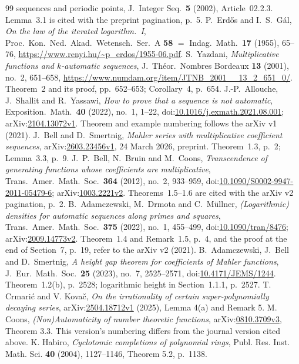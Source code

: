 \documentclass[11pt]{article}
\theoremstyle{plain}
\theoremstyle{definition}
\theoremstyle{remark}
\begin{document}
\begin{thebibliography}{99}
{sequences and periodic points}, J.\ Integer Seq.\ \textbf{5} (2002),
Article~02.2.3. Lemma~3.1 is cited with the preprint pagination, p.~5.
P.~Erd\H{o}s and I.~S.~G\'al, \emph{On the law of the iterated logarithm.~I},
Proc.\ Kon.\ Ned.\ Akad.\ Wetensch.\ Ser.~A \textbf{58} $=$ Indag.\ Math.\
\textbf{17} (1955), 65--76, \url{https://www.renyi.hu/~p_erdos/1955-06.pdf}.
\bibitem{yazdani2001} S.~Yazdani,
\emph{Multiplicative functions and $k$-automatic sequences},
J.\ Th\'eor.\ Nombres Bordeaux \textbf{13} (2001), no.~2, 651--658,
\url{https://www.numdam.org/item/JTNB_2001__13_2_651_0/}.
Theorem~2 and its proof, pp.~652--653; Corollary~4, p.~654.
 J.-P.~Allouche, J.~Shallit and R.~Yassawi,
\emph{How to prove that a sequence is not automatic},
Exposition.\ Math.\ \textbf{40} (2022), no.~1, 1--22,
doi:\href{https://doi.org/10.1016/j.exmath.2021.08.001}{10.1016/j.exmath.2021.08.001};
arXiv:\href{https://arxiv.org/abs/2104.13072v1}{2104.13072v1}.
Theorem and example numbering follows the arXiv v1 (2021).
 J.~Bell and D.~Smertnig,
\emph{Mahler series with multiplicative coefficient sequences},
arXiv:\href{https://arxiv.org/abs/2603.23456v1}{2603.23456v1},
24 March 2026, preprint. Theorem~1.3, p.~2; Lemma~3.3, p.~9.
 J.~P.~Bell, N.~Bruin and M.~Coons,
\emph{Transcendence of generating functions whose coefficients are multiplicative},
Trans.\ Amer.\ Math.\ Soc.\ \textbf{364} (2012), no.~2, 933--959,
doi:\href{https://doi.org/10.1090/S0002-9947-2011-05479-6}{10.1090/S0002-9947-2011-05479-6};
arXiv:\href{https://arxiv.org/abs/1003.2221v2}{1003.2221v2}.
Theorems~1.5--1.6 are cited with the arXiv v2 pagination, p.~2.
 B.~Adamczewski, M.~Drmota and C.~M\"ullner,
\emph{(Logarithmic) densities for automatic sequences along primes and squares},
Trans.\ Amer.\ Math.\ Soc.\ \textbf{375} (2022), no.~1, 455--499,
doi:\href{https://doi.org/10.1090/tran/8476}{10.1090/tran/8476};
arXiv:\href{https://arxiv.org/abs/2009.14773v2}{2009.14773v2}.
Theorem~1.4 and Remark~1.5, p.~4, and the proof at the end of Section~7,
p.~19, refer to the arXiv v2 (2021).
B.~Adamczewski, J.~Bell and D.~Smertnig,
\emph{A height gap theorem for coefficients of Mahler functions},
J.~Eur.~Math.~Soc.\ \textbf{25} (2023), no.~7, 2525--2571,
doi:\href{https://doi.org/10.4171/JEMS/1244}{10.4171/JEMS/1244}.
Theorem~1.2(b), p.~2528; logarithmic height in Section~1.1.1, p.~2527.
\bibitem{crmarickovac2025signed} T. Crmari\'{c} and V. Kova\v{c},
  \emph{On the irrationality of certain super-polynomially decaying series},
  arXiv:\href{https://arxiv.org/abs/2504.18712v1}{2504.18712v1} (2025),
  Lemma 4(a) and Remark 5.
 M. Coons,
  \emph{(Non)Automaticity of number theoretic functions},
  arXiv:\href{https://arxiv.org/abs/0810.3709v3}{0810.3709v3}, Theorem 3.3.
  This version's numbering differs from the journal version cited above.
\bibitem{habiro2004signed} K. Habiro,
  \emph{Cyclotomic completions of polynomial rings},
  Publ. Res. Inst. Math. Sci. \textbf{40} (2004), 1127--1146,
  Theorem 5.2, p.~1138.

\end{thebibliography}
\end{document}

